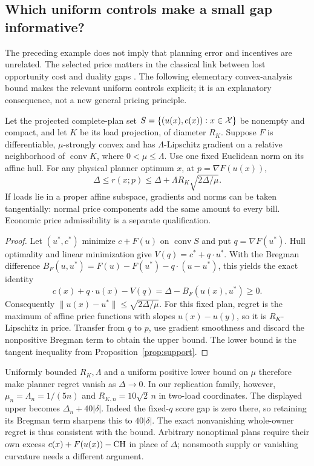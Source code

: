 \subsection{Which uniform controls make a small gap informative?}
The preceding example does not imply that planning error and incentives are
unrelated. The selected price matters in the classical link between lost
opportunity cost and duality gaps \citep{huaBaldick2017}. The following
elementary convex-analysis bound makes the relevant uniform controls explicit;
it is an explanatory consequence, not a new general pricing principle.

\begin{proposition}
\label{prop:regretbound}
Let the projected complete-plan set $S=\{(u(x),c(x)):x\in\mathcal X\}$ be nonempty
and compact, and let $K$ be its load projection, of diameter $R_K$.
Suppose $F$ is differentiable, $\mu$-strongly convex and has
$\Lambda$-Lipschitz gradient on a relative neighborhood of
$\operatorname{conv}K$, where $0<\mu\le\Lambda$.
Use one fixed Euclidean norm on its affine hull.
For any physical planner optimum $x$, at $p=\nabla F(u(x))$,
\[
 \Delta\le r(x;p)\le
 \Delta+\Lambda R_K\sqrt{2\Delta/\mu}.
\]
If loads lie in a proper affine subspace, gradients and norms can be taken
tangentially: normal price components add the same amount to every bill.
Economic price admissibility is a separate qualification.
\end{proposition}
\begin{proof}
Let $(u^*,c^*)$ minimize $c+F(u)$ on $\operatorname{conv}S$ and put
$q=\nabla F(u^*)$. Hull optimality and linear minimization give
$V(q)=c^*+q\cdot u^*$. With the Bregman difference
$B_F(u,u^*)=F(u)-F(u^*)-q\cdot(u-u^*)$, this yields the exact identity
\[
 c(x)+q\cdot u(x)-V(q)=\Delta-B_F(u(x),u^*)\ge0.
\]
Consequently $\|u(x)-u^*\|\le\sqrt{2\Delta/\mu}$.
For this fixed plan, regret is the maximum of affine price functions with
slopes $u(x)-u(y)$, so it is $R_K$-Lipschitz in price. Transfer from $q$ to
$p$, use gradient smoothness and discard the nonpositive Bregman term to
obtain the upper bound. The lower bound is the tangent inequality from
Proposition~\ref{prop:support}.
\end{proof}

Uniformly bounded $R_K,\Lambda$ and a uniform positive lower bound on
$\mu$ therefore make planner regret vanish as $\Delta\to0$. In our
replication family, however,
$\mu_n=\Lambda_n=1/(5n)$ and $R_{K,n}=10\sqrt2\,n$ in two-load
coordinates. The displayed upper becomes $\Delta_n+40|\delta|$.
Indeed the fixed-$q$ score gap is zero there, so retaining its Bregman
term sharpens this to $40|\delta|$. The exact nonvanishing whole-owner
regret is thus consistent with the bound. Arbitrary nonoptimal plans require
their own excess $c(x)+F(u(x))-\mathrm{CH}$ in place of $\Delta$; nonsmooth supply
or vanishing curvature needs a different argument.
